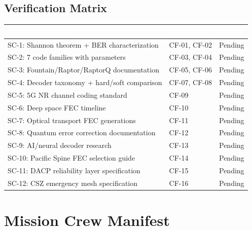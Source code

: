 \documentclass[11pt,letterpaper]{article}
\newcommand{\tableheader}[1]{\textbf{\sffamily\textcolor{white}{#1}}}
\begin{document}
\subsection{Verification Matrix}

\begin{center}
\begin{tabularx}{\textwidth}{XL{4cm}C{2cm}}
\toprule
{}
\tableheader{Success Criterion} & \tableheader{Test ID(s)} & \tableheader{Status} \\
\midrule
SC-1: Shannon theorem + BER characterization & CF-01, CF-02 & Pending \\
SC-2: 7 code families with parameters & CF-03, CF-04 & Pending \\
SC-3: Fountain/Raptor/RaptorQ documentation & CF-05, CF-06 & Pending \\
SC-4: Decoder taxonomy + hard/soft comparison & CF-07, CF-08 & Pending \\
SC-5: 5G NR channel coding standard & CF-09 & Pending \\
SC-6: Deep space FEC timeline & CF-10 & Pending \\
SC-7: Optical transport FEC generations & CF-11 & Pending \\
SC-8: Quantum error correction documentation & CF-12 & Pending \\
SC-9: AI/neural decoder research & CF-13 & Pending \\
SC-10: Pacific Spine FEC selection guide & CF-14 & Pending \\
SC-11: DACP reliability layer specification & CF-15 & Pending \\
SC-12: CSZ emergency mesh specification & CF-16 & Pending \\
\bottomrule
\end{tabularx}
\end{center}

\section{Mission Crew Manifest}
\end{document}
